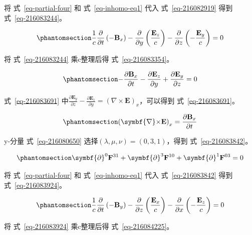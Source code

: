 \documentclass[
  chinese,
  a4paper,
  UTF8,
  12pt,
  oneside,
  openany]{ctexbook}
\begin{document}
将 式~\ref{eq-partial-four} 和 式~\ref{eq-inhomo-eq1} 代入
式~\ref{eq-216082919} 得到 式~\ref{eq-216083244}。

\begin{equation}\protect\phantomsection\label{eq-216083244}{
\frac{1}{c}\frac{\partial}{\partial t}\left( - \mathbf{B}_{x} \right) - \frac{\partial}{\partial y}\left( \frac{\mathbf{E}_{z}}{c} \right) - \frac{\partial}{\partial z}\left( - \frac{\mathbf{E}_{y}}{c} \right) = 0
}\end{equation}

将 式~\ref{eq-216083244} 乘c整理后得 式~\ref{eq-216083354}。

\begin{equation}\protect\phantomsection\label{eq-216083354}{
- \frac{\partial\mathbf{B}_{x}}{\partial t} - \frac{\partial\mathbf{E}_{z}}{\partial y} + \frac{\partial\mathbf{E}_{y}}{\partial z} = 0
}\end{equation}

式~\ref{eq-216083691}
中\(\frac{\partial\mathbf{E}_{y}}{\partial z} - \frac{\partial\mathbf{E}_{z}}{\partial y} = \left( \nabla \times \mathbf{E} \right)_{x}\)，可以得到
式~\ref{eq-216083691}。

\begin{equation}\protect\phantomsection\label{eq-216083691}{
\left( \symbf{\nabla}\mathbf{\times E} \right)_{x} = \frac{\partial\mathbf{B}_{x}}{\partial t}
}\end{equation}

y-分量 式~\ref{eq-216080650} 选择\((\lambda,\mu,\nu) = (0,3,1)\)，得到
式~\ref{eq-216083842}。

\begin{equation}\protect\phantomsection\label{eq-216083842}{
\symbf{\partial}^{0}\mathbf{F}^{31} + \symbf{\partial}^{3}\mathbf{F}^{10} + \symbf{\partial}^{1}\mathbf{F}^{03} = 0
}\end{equation}

将 式~\ref{eq-partial-four} 和 式~\ref{eq-inhomo-eq1} 代入
式~\ref{eq-216083842} 得到 式~\ref{eq-216083924}。

\begin{equation}\protect\phantomsection\label{eq-216083924}{
\frac{1}{c}\frac{\partial}{\partial t}\left( - \mathbf{B}_{y} \right) - \frac{\partial}{\partial z}\left( \frac{\mathbf{E}_{x}}{c} \right) - \frac{\partial}{\partial x}\left( - \frac{\mathbf{E}_{z}}{c} \right) = 0
}\end{equation}

将 式~\ref{eq-216083924} 乘c整理后得 式~\ref{eq-216084225}。
\end{document}
